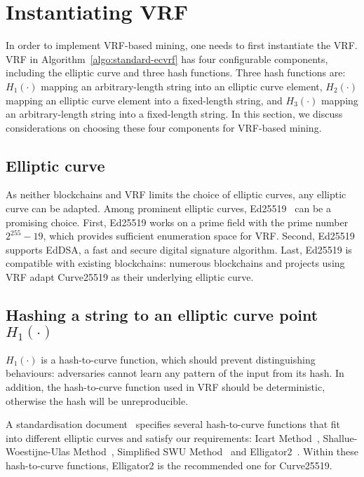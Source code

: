 \section{Instantiating VRF}
\label{sec:instantiation}

In order to implement VRF-based mining, one needs to first instantiate the VRF.
VRF in Algorithm~\ref{algo:standard-ecvrf} has four configurable components, including the elliptic curve and three hash functions.
Three hash functions are:
$H_{1}(\cdot)$ mapping an arbitrary-length string into an elliptic curve element,
$H_{2}(\cdot)$ mapping an elliptic curve element into a fixed-length string, and
$H_{3}(\cdot)$ mapping an arbitrary-length string into a fixed-length string.
In this section, we discuss considerations on choosing these four components for VRF-based mining.





\subsection{Elliptic curve}

As neither blockchains and VRF limits the choice of elliptic curves, any elliptic curve can be adapted.
Among prominent elliptic curves, Ed25519~\cite{bernstein2012high} can be a promising choice.
First, Ed25519 works on a prime field with the prime number $2^{255} - 19$, which provides sufficient enumeration space for VRF.
Second, Ed25519 supports EdDSA, a fast and secure digital signature algorithm.
Last, Ed25519 is compatible with existing blockchains: numerous blockchains and projects using VRF adapt Curve25519 as their underlying elliptic curve.




\subsection{Hashing a string to an elliptic curve point $H_{1}(\cdot)$}

$H_{1}(\cdot)$ is a hash-to-curve function, which should prevent distinguishing behaviours: adversaries cannot learn any pattern of the input from its hash.
In addition, the hash-to-curve function used in VRF should be deterministic, otherwise the hash will be unreproducible.

A standardisation document~\cite{scott2019hashing} specifies several hash-to-curve functions that fit into different elliptic curves and satisfy our requirements: Icart Method~\cite{icart2009hash}, Shallue-Woestijne-Ulas Method~\cite{ulas2007rational}, Simplified SWU Method~\cite{brier2010efficient} and Elligator2~\cite{bernstein2013elligator}.
Within these hash-to-curve functions, Elligator2 is the recommended one for Curve25519.




